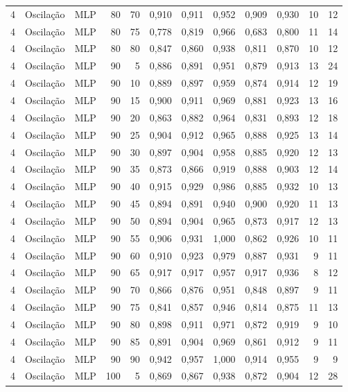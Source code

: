 \begin{longtable}{@{}rllrrrrrrrrr@{}}
4 & Oscilação & MLP & 80 & 70 & 0,910 & 0,911 & 0,952 & 0,909 & 0,930 & 10 & 12 \\
4 & Oscilação & MLP & 80 & 75 & 0,778 & 0,819 & 0,966 & 0,683 & 0,800 & 11 & 14 \\
4 & Oscilação & MLP & 80 & 80 & 0,847 & 0,860 & 0,938 & 0,811 & 0,870 & 10 & 12 \\
4 & Oscilação & MLP & 90 & 5 & 0,886 & 0,891 & 0,951 & 0,879 & 0,913 & 13 & 24 \\
4 & Oscilação & MLP & 90 & 10 & 0,889 & 0,897 & 0,959 & 0,874 & 0,914 & 12 & 19 \\
4 & Oscilação & MLP & 90 & 15 & 0,900 & 0,911 & 0,969 & 0,881 & 0,923 & 13 & 16 \\
4 & Oscilação & MLP & 90 & 20 & 0,863 & 0,882 & 0,964 & 0,831 & 0,893 & 12 & 18 \\
4 & Oscilação & MLP & 90 & 25 & 0,904 & 0,912 & 0,965 & 0,888 & 0,925 & 13 & 14 \\
4 & Oscilação & MLP & 90 & 30 & 0,897 & 0,904 & 0,958 & 0,885 & 0,920 & 12 & 13 \\
4 & Oscilação & MLP & 90 & 35 & 0,873 & 0,866 & 0,919 & 0,888 & 0,903 & 12 & 14 \\
4 & Oscilação & MLP & 90 & 40 & 0,915 & 0,929 & 0,986 & 0,885 & 0,932 & 10 & 13 \\
4 & Oscilação & MLP & 90 & 45 & 0,894 & 0,891 & 0,940 & 0,900 & 0,920 & 11 & 13 \\
4 & Oscilação & MLP & 90 & 50 & 0,894 & 0,904 & 0,965 & 0,873 & 0,917 & 12 & 13 \\
4 & Oscilação & MLP & 90 & 55 & 0,906 & 0,931 & 1,000 & 0,862 & 0,926 & 10 & 11 \\
4 & Oscilação & MLP & 90 & 60 & 0,910 & 0,923 & 0,979 & 0,887 & 0,931 & 9 & 11 \\
4 & Oscilação & MLP & 90 & 65 & 0,917 & 0,917 & 0,957 & 0,917 & 0,936 & 8 & 12 \\
4 & Oscilação & MLP & 90 & 70 & 0,866 & 0,876 & 0,951 & 0,848 & 0,897 & 9 & 11 \\
4 & Oscilação & MLP & 90 & 75 & 0,841 & 0,857 & 0,946 & 0,814 & 0,875 & 11 & 13 \\
4 & Oscilação & MLP & 90 & 80 & 0,898 & 0,911 & 0,971 & 0,872 & 0,919 & 9 & 10 \\
4 & Oscilação & MLP & 90 & 85 & 0,891 & 0,904 & 0,969 & 0,861 & 0,912 & 9 & 11 \\
4 & Oscilação & MLP & 90 & 90 & 0,942 & 0,957 & 1,000 & 0,914 & 0,955 & 9 & 9 \\
4 & Oscilação & MLP & 100 & 5 & 0,869 & 0,867 & 0,938 & 0,872 & 0,904 & 12 & 28 \\

\end{longtable}
